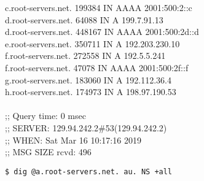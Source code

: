 \documentclass[a4paper,11pt]{article}
\newcommand{\code}{\texttt}
\begin{document}
\begin{enumerate}[leftmargin=*]
{	c.root-servers.net.	199384	IN	AAAA	2001:500:2::c\\
	d.root-servers.net.	64088	IN	A	199.7.91.13\\
	d.root-servers.net.	448167	IN	AAAA	2001:500:2d::d\\
	e.root-servers.net.	350711	IN	A	192.203.230.10\\
	f.root-servers.net.	272558	IN	A	192.5.5.241\\
	f.root-servers.net.	47078	IN	AAAA	2001:500:2f::f\\
	g.root-servers.net.	183060	IN	A	192.112.36.4\\
	h.root-servers.net.	174973	IN	A	198.97.190.53\\
	\\
	;; Query time: 0 msec\\
	;; SERVER: 129.94.242.2\#53(129.94.242.2)\\
	;; WHEN: Sat Mar 16 10:17:16 2019\\
	;; MSG SIZE  rcvd: 496\\}

	\code{\$ dig @a.root-servers.net. au. NS +all}


\end{enumerate}
\end{document}
